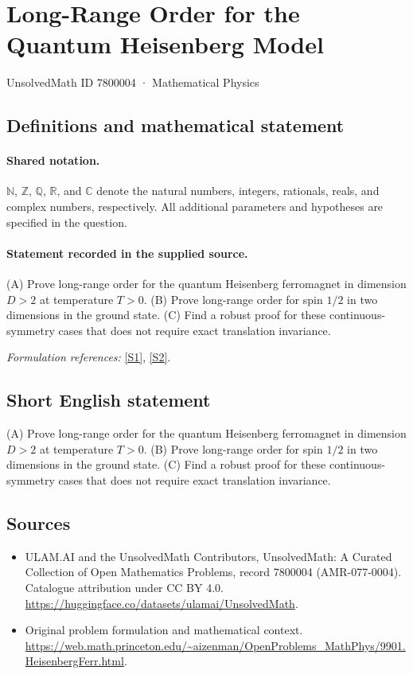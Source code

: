 \documentclass[11pt]{article}
\newcommand{\sref}[2]{\hyperlink{source:#1:#2}{[S#2]}}
\begin{document}
\setcounter{section}{7800003}
\section{Long-Range Order for the Quantum Heisenberg Model}\label{7800004}
{\small UnsolvedMath ID 7800004 · Mathematical Physics}
\subsection{Definitions and mathematical statement}

\paragraph{Shared notation.}$\mathbb N$, $\mathbb Z$, $\mathbb Q$, $\mathbb R$, and $\mathbb C$ denote the natural numbers, integers, rationals, reals, and complex numbers, respectively. All additional parameters and hypotheses are specified in the question.


\paragraph{Statement recorded in the supplied source.}
(A) Prove long-range order for the quantum Heisenberg ferromagnet in dimension $D>2$ at temperature $T>0$. (B) Prove long-range order for spin $1/2$ in two dimensions in the ground state. (C) Find a robust proof for these continuous-symmetry cases that does not require exact translation invariance.
\par\smallskip\textit{Formulation references:} \sref{7800004}{1}, \sref{7800004}{2}.
\subsection{Short English statement}
(A) Prove long-range order for the quantum Heisenberg ferromagnet in dimension $D>2$ at temperature $T>0$. (B) Prove long-range order for spin $1/2$ in two dimensions in the ground state. (C) Find a robust proof for these continuous-symmetry cases that does not require exact translation invariance.
\subsection{Sources}
\begin{itemize}
\item[\hypertarget{source:7800004:1}{S1}] ULAM.AI and the UnsolvedMath Contributors, UnsolvedMath: A Curated Collection of Open Mathematics Problems, record 7800004 (AMR-077-0004). Catalogue attribution under CC BY 4.0.
\url{https://huggingface.co/datasets/ulamai/UnsolvedMath}.
\item[\hypertarget{source:7800004:2}{S2}] Original problem formulation and mathematical context.
\url{https://web.math.princeton.edu/~aizenman/OpenProblems_MathPhys/9901.HeisenbergFerr.html}.
\end{itemize}
\label{end:7800004}
\end{document}
